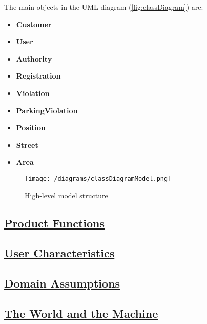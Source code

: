 	The main objects in the UML diagram (\autoref{fig:classDiagram}) are:
	\begin{itemize}
		\item \textbf{Customer}
		\item \textbf{User}
		\item \textbf{Authority}
		\item \textbf{Registration} 
		\item \textbf{Violation}
		\item \textbf{ParkingViolation}
		\item \textbf{Position}
		\item \textbf{Street}
		\item \textbf{Area}
	\end{itemize}
	
	\begin{figure}[h!]
		\centering
		\texttt{[image: /diagrams/classDiagramModel.png]}
		\caption{\label{fig:classDiagram}High-level model structure}
	\end{figure}

\subsection[Product Functions]{\hyperlink{toc}{Product Functions}}

\subsection[User Characteristics]{\hyperlink{toc}{User Characteristics}}

\subsection[Domain Assumptions]{\hyperlink{toc}{Domain Assumptions}}

\subsection[The World and the Machine]{\hyperlink{toc}{The World and the Machine}}